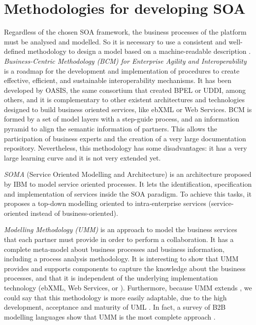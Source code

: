 \section{Methodologies for developing SOA}
Regardless of the chosen SOA framework, the business processes of the platform must be analysed and modelled. So it is necessary to use a consistent and well-defined methodology to design a model based on a machine-readable description \cite{Garcia09UMM}. {\em Business-Centric Methodology (BCM) for Enterprise Agility and Interoperability} \cite{Oasis03BCM} is a roadmap for the development and implementation of procedures to create effective, efficient, and sustainable interoperability mechanisms. It has been developed by OASIS, the same consortium that created BPEL or UDDI, among others, and it is complementary to other existent architectures and technologies designed to build business oriented services, like ebXML or Web Services. BCM is formed by a set of model layers with a step-guide process, and an information pyramid to align the semantic information of partners. This allows the participation of business experts and the creation of a very large documentation repository. Nevertheless, this methodology has some disadvantages: it has a very large learning curve and it is not very extended yet. 

{\em SOMA} (Service Oriented Modelling and Architecture) \cite{Arsanjani2008SOMA} is an architecture proposed by IBM to model service oriented processes. It lets the identification, specification and implementation of services inside the SOA paradigm. To achieve this tasks, it proposes a top-down modelling oriented to intra-enterprise services (service-oriented instead of business-oriented).

{\em {} Modelling Methodology (UMM)} \cite{Hofreiter06UMM} is an approach to model the business services that each partner must provide in order to perform a  collaboration. It has a complete meta-model about business processes and business information, including a process analysis methodology. It is interesting to show that UMM provides and supports components to capture the knowledge about the business processes, and that it is independent of the underlying implementation technology (ebXML, Web Services,  or ). Furthermore, because UMM extends , we could say that this methodology is more easily adaptable, due to the high development, acceptance and maturity of UML \cite{Garcia09UMM}. In fact, a survey of B2B modelling languages show that UMM is the most complete approach \cite{Folmer08b2b}.

